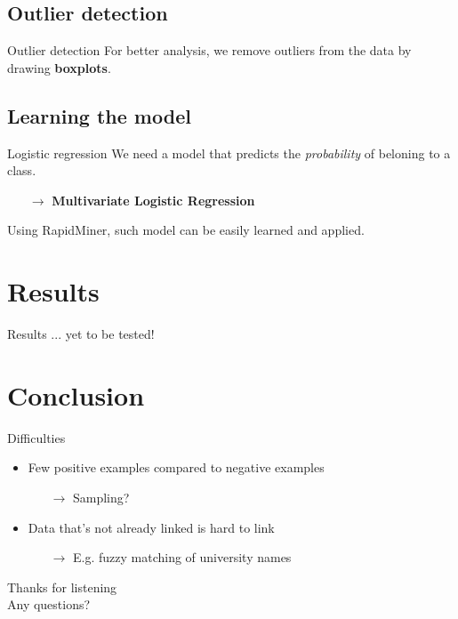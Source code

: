 \documentclass[nonav,sleutel]{beamer}
\begin{document}
\subsection{Outlier detection}
\begin{frame}{Outlier detection}
For better analysis, we remove outliers from the data by drawing \textbf{boxplots}.
\end{frame}


\subsection{Learning the model}

\begin{frame}{Logistic regression}
We need a model that predicts the \emph{probability} of beloning to a class.\\[.5cm]
	\pause
	\begin{itemize}
		\item[$\rightarrow$] \textbf{Multivariate Logistic Regression}
	\end{itemize}
\vspace{.5cm}
Using RapidMiner, such model can be easily learned and applied. 
\end{frame}

\section{Results}

\begin{frame}{Results}
... yet to be tested!\\[.5cm]
	
\end{frame}

\section{Conclusion}

\begin{frame}{Difficulties}
\begin{itemize}
	\item Few positive examples compared to negative examples
		\begin{itemize}
			\item[$\rightarrow$] Sampling?
		\end{itemize}
	\item Data that's not already linked is hard to link
		\begin{itemize}
			\item[$\rightarrow$] E.g. fuzzy matching of university names
		\end{itemize}
\end{itemize}
\end{frame}

\begin{frame}
\begin{center}
\Large{Thanks for listening}\\
Any questions?
\end{center}

\end{frame}
\end{document}
